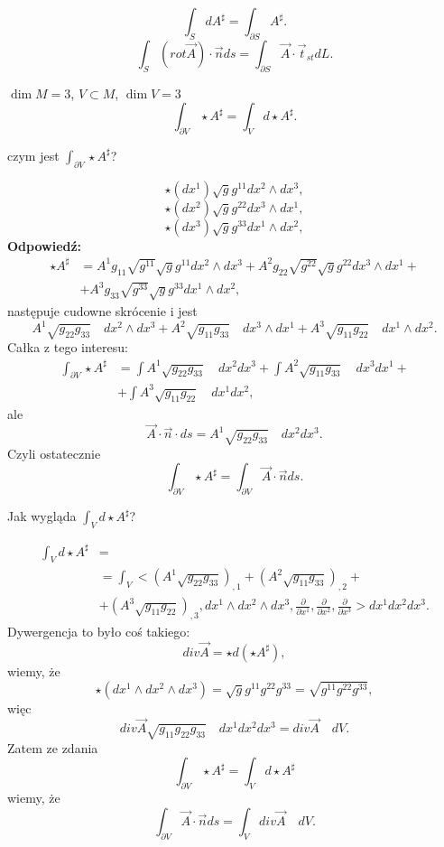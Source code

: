 \documentclass[../main.tex]{subfiles}
\begin{document}
\[
\int_S dA^\sharp = \int_{\partial S}A^\sharp
.\]
\[
    \int_S\left( rot \vec{A} \right) \cdot \vec{n} ds = \int_{\partial S}\vec{A} \cdot \vec{t}_{st}dL
.\]
\begin{przyklad}
    $\dim M = 3$, $V \subset M$, $\dim V = 3$
     \[
    \int_{\partial V}\star A^\sharp = \int_V d\star A^\sharp
    .\]
\end{przyklad}
\begin{pytanie}
czym jest $\int_{\partial V}\star A^\sharp$?
\end{pytanie}
\[
    \star(dx^{1})\sqrt{g}g^{11}  dx^{2}\land dx^{3}
,\]
\[
    \star(dx^{2})\sqrt{g}g^{22}  dx^{3}\land dx^{1}
,\]
\[
    \star(dx^{3})\sqrt{g}g^{33}  dx^{1}\land dx^{2}
,\]
\textbf{Odpowiedź:}
\begin{align*}
    \star A^\sharp &= A^1g_{11}\sqrt{g^{11}} \sqrt{g} g^{11}dx^{2} \land dx^{3} + A^2 g_{22}\sqrt{g^{22}} \sqrt{g} g^{22} dx^{3} \land dx^{1} +\\
    &+A^3 g_{33}\sqrt{g^{33}} \sqrt{g} g^{33}dx^{1} \land dx^{2}
,\end{align*}
następuje cudowne skrócenie i jest
\[
A^1 \sqrt{g_{22}g_{33}}\quad dx^{2} \land dx^{3}  + A^2 \sqrt{g_{11}g_{33}} \quad dx^{3} \land dx^{1} + A^3 \sqrt{g_{11}g_{22}} \quad dx^{1} \land dx^{2}
.\]
Całka z tego interesu:
\begin{align*}
    \int_{\partial V}\star A^\sharp &= \int A^1 \sqrt{g_{22}g_{33}}\quad dx^{2} dx^{3} + \int A^2 \sqrt{g_{11}g_{33}}\quad dx^{3} dx^{1} + \\
&+ \int A^3 \sqrt{g_{11}g_{22}} \quad dx^{1}  dx^{2}
,\end{align*}
ale
\[
    \vec{A}\cdot \vec{n}\cdot ds = A^1 \sqrt{g_{22}g_{33}}\quad dx^{2} dx^{3}
.\]
Czyli ostatecznie
\[
    \int_{\partial V}\star A^\sharp = \int_{\partial V}\vec{A}\cdot \vec{n}ds
.\]
\begin{pytanie}
Jak wygląda $\int_Vd\star A^\sharp$?
\end{pytanie}
\begin{align*}
    \int_{V}d\star A^\sharp &=\\
    &= \int_{V} \Bigg< \left( A^1\sqrt{g_{22}g_{33}} \right)_{,1} + \left( A^2\sqrt{g_{11}g_{33}}  \right) _{,2} +\\
    &+ \left( A^3\sqrt{g_{11}g_{22}}  \right) _{,3}, dx^{1} \land dx^{2} \land dx^{3} , \frac{\partial }{\partial x^1} , \frac{\partial }{\partial x^2} , \frac{\partial }{\partial x^3} \Bigg> dx^{1} dx^{2} dx^{3}
.\end{align*}
Dywergencja to było coś takiego:
\[
    div \vec{A} = \star d\left( \star A^\sharp \right)
,\]
wiemy, że
\[
    \star\left( dx^{1} \land dx^{2} \land dx^{3}  \right) = \sqrt{g} g^{11}g^{22}g^{33} = \sqrt{g^{11}g^{22}g^{33}}
,\]
więc
\[
    div \vec{A} \sqrt{g_{11}g_{22}g_{33}}\quad dx^{1} dx^{2} dx^{3}= div\vec{A}\quad dV
.\]
Zatem ze zdania
\[
\int_{\partial V}\star A^\sharp = \int_V d\star A^\sharp
\]
wiemy, że
\[
    \int_{\partial V}\vec{A}\cdot \vec{n} ds = \int_V div \vec{A} \quad dV
.\]
\end{document}
